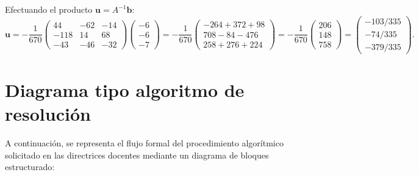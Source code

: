 \documentclass[spanish,letterpaper,oneside]{article}
\begin{document}
Efectuando el producto $\mathbf{u} = A^{-1} \mathbf{b}$:
\begin{equation}
\mathbf{u} = -\frac{1}{670} \begin{pmatrix} 44 & -62 & -14 \\ -118 & 14 & 68 \\ -43 & -46 & -32 \end{pmatrix} \begin{pmatrix} -6 \\ -6 \\ -7 \end{pmatrix} =
-\frac{1}{670} \begin{pmatrix} -264 + 372 + 98 \\ 708 - 84 - 476 \\ 258 + 276 + 224 \end{pmatrix} =
-\frac{1}{670} \begin{pmatrix} 206 \\ 148 \\ 758 \end{pmatrix} =
\begin{pmatrix} -103/335 \\ -74/335 \\ -379/335 \end{pmatrix}.
\end{equation}

\section{Diagrama tipo algoritmo de resolución}

A continuación, se representa el flujo formal del procedimiento algorítmico solicitado en las directrices docentes mediante un diagrama de bloques estructurado:
\end{document}
